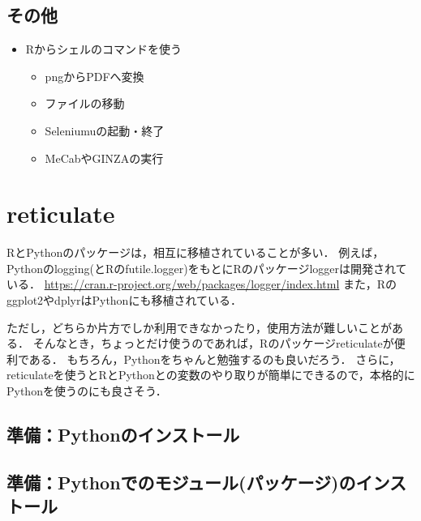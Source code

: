 \documentclass[
]{article}
\providecommand{\tightlist}{%
  \setlength{\itemsep}{0pt}\setlength{\parskip}{0pt}}
\begin{document}
\hypertarget{ux305dux306eux4ed6}{%
\subsection{その他}\label{ux305dux306eux4ed6}}

\begin{itemize}
\tightlist
\item
  Rからシェルのコマンドを使う

  \begin{itemize}
  \tightlist
  \item
    pngからPDFへ変換\\
  \item
    ファイルの移動\\
  \item
    Seleniumuの起動・終了\\
  \item
    MeCabやGINZAの実行
  \end{itemize}
\end{itemize}

\hypertarget{reticulate}{%
\section{reticulate}\label{reticulate}}

RとPythonのパッケージは，相互に移植されていることが多い．
例えば，Pythonのlogging(とRのfutile.logger)をもとにRのパッケージloggerは開発されている．
\url{https://cran.r-project.org/web/packages/logger/index.html}
また，Rのggplot2やdplyrはPythonにも移植されている．

ただし，どちらか片方でしか利用できなかったり，使用方法が難しいことがある．
そんなとき，ちょっとだけ使うのであれば，Rのパッケージreticulateが便利である．
もちろん，Pythonをちゃんと勉強するのも良いだろう．
さらに，reticulateを使うとRとPythonとの変数のやり取りが簡単にできるので，本格的にPythonを使うのにも良さそう．

\hypertarget{ux6e96ux5099pythonux306eux30a4ux30f3ux30b9ux30c8ux30fcux30eb}{%
\subsection{準備：Pythonのインストール}\label{ux6e96ux5099pythonux306eux30a4ux30f3ux30b9ux30c8ux30fcux30eb}}

\hypertarget{ux6e96ux5099pythonux3067ux306eux30e2ux30b8ux30e5ux30fcux30ebux30d1ux30c3ux30b1ux30fcux30b8ux306eux30a4ux30f3ux30b9ux30c8ux30fcux30eb}{%
\subsection{準備：Pythonでのモジュール(パッケージ)のインストール}\label{ux6e96ux5099pythonux3067ux306eux30e2ux30b8ux30e5ux30fcux30ebux30d1ux30c3ux30b1ux30fcux30b8ux306eux30a4ux30f3ux30b9ux30c8ux30fcux30eb}}
\end{document}
